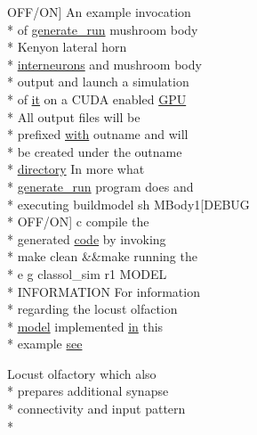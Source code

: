 \begin{DoxyCompactItemize}
O\+F\+F/O\+N\mbox{]} An example invocation \\*
of \hyperlink{userproject_2MBody__userdef__project_2README_8txt_a320a215d1e27b4de394be70e90d22863}{generate\+\_\+run} mushroom body \\*
Kenyon lateral horn \\*
\hyperlink{userproject_2SynDelay__project_2README_8txt_adf6327d22e2c11a62a22ab5afd4f2b81}{interneurons} and mushroom body \\*
output and launch a simulation \\*
of \hyperlink{userproject_2PoissonIzh__project_2README_8txt_a3e3bbb6c9b14c38757cf273a117e43e8}{it} on a C\+U\+D\+A enabled \hyperlink{modelSpec_8h_a39cb9803524b6f3b783344b2f89867b4}{G\+P\+U} \\*
All output files will be \\*
prefixed \hyperlink{userproject_2OneComp__project_2README_8txt_ace09bb40fbf4457ad9a9340a67a4fa9a}{with} outname and will \\*
be created under the outname \\*
\hyperlink{README_8txt_ae619b68020535fba5ac79522a0d9d1c4}{directory} In more what \\*
\hyperlink{userproject_2MBody__userdef__project_2README_8txt_a320a215d1e27b4de394be70e90d22863}{generate\+\_\+run} program does and \\*
executing buildmodel sh M\+Body1\mbox{[}D\+E\+B\+U\+G \\*
O\+F\+F/O\+N\mbox{]} c compile the \\*
generated \hyperlink{userproject_2MBody__userdef__project_2README_8txt_aeec4e596748e7c29dd5548dae4c70685}{code} by invoking \\*
make clean \&\&make running the \\*
e g classol\+\_\+sim r1 M\+O\+D\+E\+L \\*
I\+N\+F\+O\+R\+M\+A\+T\+I\+O\+N For information \\*
regarding the locust olfaction \\*
\hyperlink{README_8txt_a69fd801b7213948c12d9dd7eebb3ed14}{model} implemented \hyperlink{README_8txt_a148897a6b2cc9cff25af80abb13426b0}{in} this \\*
example \hyperlink{userproject_2MBody1__project_2README_8txt_a7623704c3180122db9ddbc877ff0fb32}{see}
\item 
Locust olfactory which also \\*
prepares additional synapse \\*
connectivity and input pattern \\*

\end{DoxyCompactItemize}
